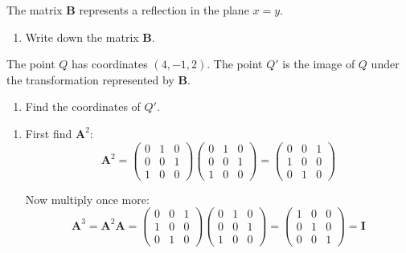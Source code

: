 \documentclass[leqno]{article}
\begin{document}
\begin{enumerate}[
  label=\textbf{\arabic*.},
  leftmargin=*,
  topsep=0pt,
  partopsep=0pt,
  parsep=0pt
]
The matrix $\mathbf{B}$ represents a reflection in the plane $x = y$. \\

\begin{enumerate}[label=\textbf{(\alph*)}, resume]
  \item Write down the matrix $\mathbf{B}$.  \\
\end{enumerate}

The point $Q$ has coordinates $(4, -1, 2)$. The point $Q'$ is the image of $Q$ under the transformation represented by $\mathbf{B}$. \\

\begin{enumerate}[label=\textbf{(\alph*)}, resume]
  \item Find the coordinates of $Q'$.  \\
\end{enumerate}

\vspace*{10pt}

\begin{djsSolution}
\begin{enumerate}[label=\textbf{(\alph*)}]
  \item First find \(\mathbf{A}^2\):
\[
\mathbf{A}^2
=
\begin{pmatrix}
0 & 1 & 0\\
0 & 0 & 1\\
1 & 0 & 0
\end{pmatrix}
\begin{pmatrix}
0 & 1 & 0\\
0 & 0 & 1\\
1 & 0 & 0
\end{pmatrix}
=
\begin{pmatrix}
0 & 0 & 1\\
1 & 0 & 0\\
0 & 1 & 0
\end{pmatrix}
\]

Now multiply once more:
\[
\mathbf{A}^3
=
\mathbf{A}^2\mathbf{A}
=
\begin{pmatrix}
0 & 0 & 1\\
1 & 0 & 0\\
0 & 1 & 0
\end{pmatrix}
\begin{pmatrix}
0 & 1 & 0\\
0 & 0 & 1\\
1 & 0 & 0
\end{pmatrix}
=
\begin{pmatrix}
1 & 0 & 0\\
0 & 1 & 0\\
0 & 0 & 1
\end{pmatrix}
=
\mathbf{I}
\]


\end{enumerate}
\end{djsSolution}
\end{enumerate}
\end{document}
